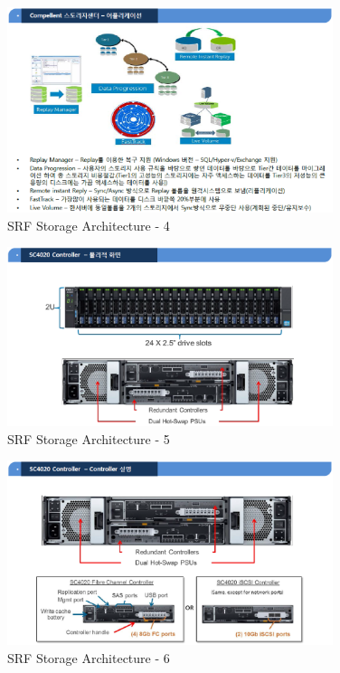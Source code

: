 \documentclass[11pt
  , a4paper
  , article
  , oneside
]{memoir}
\begin{document}
\begin{figure}[h!]
	\centering
	\includegraphics[width=0.85\textwidth]{./images/srfdb_storage_arch_4.eps}
	\caption{SRF Storage Architecture - 4}
	\label{fig:srfdb_arch_4} 
\end{figure}

\begin{figure}[h!]
	\centering
	\includegraphics[width=0.85\textwidth]{./images/srfdb_storage_arch_5.eps}
	\caption{SRF Storage Architecture - 5}
	\label{fig:srfdb_arch_5} 
\end{figure}

\begin{figure}[h!]
	\centering
	\includegraphics[width=0.85\textwidth]{./images/srfdb_storage_arch_6.eps}
	\caption{SRF Storage Architecture - 6}
	\label{fig:srfdb_arch_6} 
\end{figure}
\end{document}
